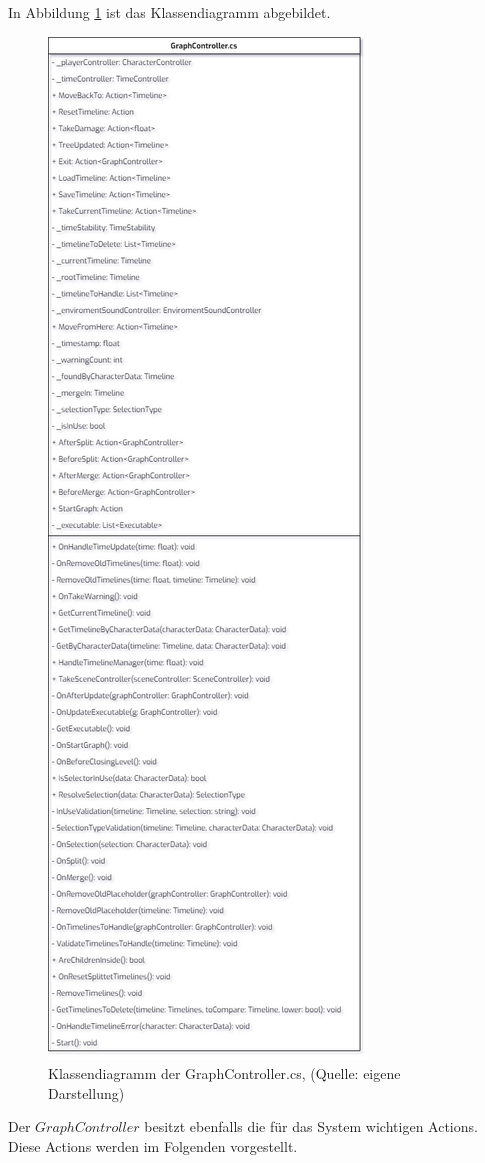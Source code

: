 In Abbildung \ref{fig:graphController-cs} ist das Klassendiagramm abgebildet.
\begin{figure}[ht]
\centering
\includegraphics[width=0.5\linewidth]{content/pictures/GraphController.jpg}
\caption{Klassendiagramm der GraphController.cs, (Quelle: eigene Darstellung)}
\label{fig:graphController-cs}
\end{figure}

Der $GraphController$ besitzt ebenfalls die für das System wichtigen Actions. Diese Actions werden im Folgenden vorgestellt.

